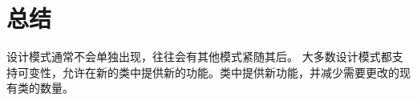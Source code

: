 \section{总结}
设计模式通常不会单独出现，往往会有其他模式紧随其后。
大多数设计模式都支持可变性，允许在新的类中提供新的功能。类中提供新功能，并减少需要更改的现有类的数量。
































